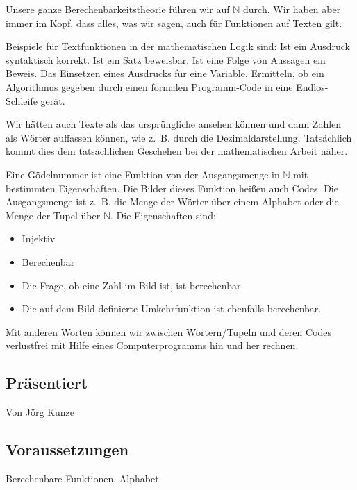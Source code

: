 \documentclass[a4paper]{amsart}
\theoremstyle{definition}
\newcommand{\N}{\ensuremath{\mathbb{ N }}}
\newcommand{\zb}{z.~B. }
\begin{document}
Unsere ganze Berechenbarkeitstheorie führen wir auf $\N$ durch. Wir haben aber immer im Kopf, dass alles, was wir sagen, auch für Funktionen auf Texten gilt.

Beispiele für Textfunktionen in der mathematischen Logik sind: Ist ein Ausdruck syntaktisch korrekt. Ist ein Satz beweisbar. Ist eine Folge von Aussagen ein Beweis. Das Einsetzen eines Ausdrucks für eine Variable. Ermitteln, ob ein Algorithmus gegeben durch einen formalen Programm-Code in eine Endlos-Schleife gerät.

Wir hätten auch Texte als das ursprüngliche ansehen können und dann Zahlen als Wörter auffassen können, wie \zb durch die Dezimaldarstellung. Tatsächlich kommt dies dem tatsächlichen Geschehen bei der mathematischen Arbeit näher.

Eine Gödelnummer ist eine Funktion von der Ausgangsmenge in $\N$ mit bestimmten Eigenschaften. Die Bilder dieses Funktion heißen auch Codes. Die Ausgangsmenge ist \zb die Menge der Wörter über einem Alphabet oder die Menge der Tupel über $\N$. Die Eigenschaften sind:
\begin{itemize}
   \item Injektiv
   \item Berechenbar
   \item Die Frage, ob eine Zahl im Bild ist, ist berechenbar
   \item Die auf dem Bild definierte Umkehrfunktion ist ebenfalls berechenbar.
\end{itemize}
Mit anderen Worten können wir zwischen Wörtern/Tupeln und deren Codes verlustfrei mit Hilfe eines Computerprogramms hin und her rechnen.

\subsection*{Präsentiert}
Von Jörg Kunze

\subsection*{Voraussetzungen}
Berechenbare Funktionen, Alphabet
\end{document}
